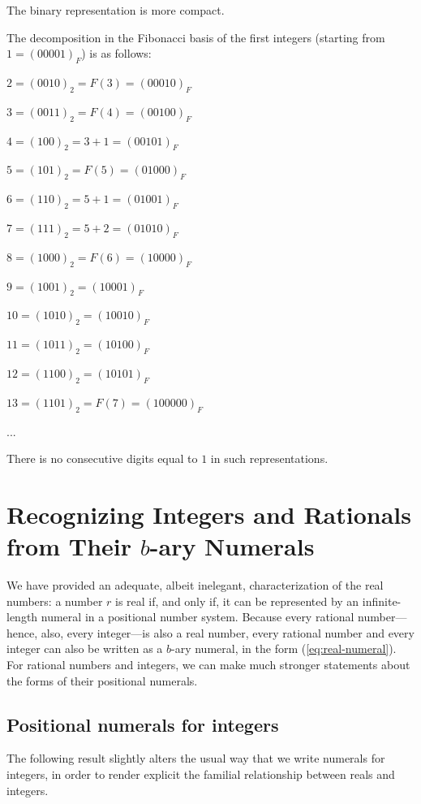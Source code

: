 The binary representation is more compact. 
\bigskip

The decomposition in the Fibonacci basis of the first integers (starting from $1 = (00001)_F$) is as follows:

 $2 = (0010)_2 = F(3) = (00010)_F$
 
 $3 = (0011)_2 = F(4) = (00100)_F$
  
 $4 = (100)_2 = 3+1 = (00101)_F$
 
 $5 = (101)_2 = F(5) = (01000)_F$
 
 $6 = (110)_2 = 5+1 = (01001)_F$
 
 $7 = (111)_2 = 5+2 = (01010)_F$
 
 $8 = (1000)_2 = F(6) = (10000)_F$
 
 $9 = (1001)_2 = (10001)_F$
 
 $10 = (1010)_2 = (10010)_F$
 
 $11 = (1011)_2 = (10100)_F$
 
 $12 = (1100)_2 = (10101)_F$
 
 $13 = (1101)_2 = F(7) =(100000)_F$
 
 ...
 
There is no consecutive digits equal to $1$ in such representations.


\section{Recognizing Integers and  Rationals from Their $b$-ary Numerals}
\label{sec:special-numerals-N-Q}

We have provided an adequate, albeit inelegant, characterization of
the real numbers: a number $r$ is real if, and only if, it can be
represented by an infinite-length numeral in a positional number
system.  Because every rational number---hence, also, every
integer---is also a real number, every rational number and every
integer can also be written as a $b$-ary numeral, in the form
(\ref{eq:real-numeral}).  For rational numbers and integers, we can
make much stronger statements about the forms of their positional
numerals.


\subsection{Positional numerals for integers}
\label{sec:special-numerals-N}

The following result slightly alters the usual way that we write
numerals for integers, in order to render explicit the familial
relationship between reals and integers.

